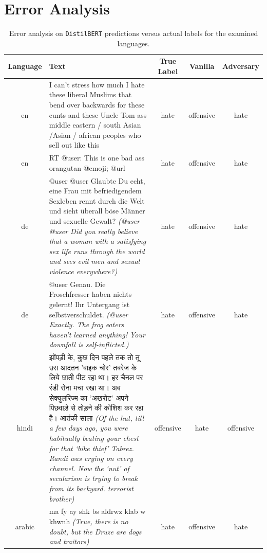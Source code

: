 \documentclass[11pt]{article}
\newcommand{\setfootnotemark}{%
  \refstepcounter{footnote}%
  \footnotemark[\value{footnote}]}
\begin{document}
	\section{Error Analysis}
	
	\begin{table}[h!]
		\small
		\centering
		\begin{tabular}{|c|p{7.4cm}|c|c|c|}
			\hline Language & Text & True Label & Vanilla & Adversary\\ \hline
			en &  I can’t stress how much I hate these liberal Muslims that bend over backwards for these cunts and these Uncle Tom ass middle eastern / south Asian /Asian / african peoples who sell out like this & hate & offensive & hate\\\hline
			en & RT @user: This is one bad ass orangutan @emoji; @url & hate & offensive & hate\\\hline
			de & @user @user Glaubte Du echt, eine Frau mit befriedigendem Sexleben rennt durch die Welt und sieht überall böse Männer und sexuelle Gewalt? \textit{(@user @user Did you really believe that a woman with a satisfying sex life runs through the world and sees evil men and sexual violence everywhere?)}  & hate & offensive & hate\\\hline
			de & @user Genau. Die Froschfresser haben nichts gelernt! Ihr Untergang ist selbstverschuldet. \textit{(@user Exactly. The frog eaters haven't learned anything! Your downfall is self-inflicted.)} & hate & offensive & hate\\\hline
			hindi& {\hindifont झोंपड़ी के, कुछ दिन पहले तक तो तू उस आदतन 'बाइक चोर' तबरेज के लिये छाती पीट रहा था। हर चैनल पर रंडी रोना मचा रखा था। अब सेक्युलरिज्म का 'अखरोट' अपने पिछवाड़े से तोड़ने की कोशिश कर रहा है। आतंकी साला} \textit{(Of the hut, till a few days ago, you were habitually beating your chest for that `bike thief' Tabrez. Randi was crying on every channel. Now the `nut' of secularism is trying to break from its backyard. terrorist brother)} & offensive & hate & offensive\\\hline
			arabic& ma fy ay shk bs aldrwz klab w khwnh\setfootnotemark\label{first} \textit{(True, there is no doubt, but the Druze are dogs and traitors)} & hate & offensive & hate\\\hline
		\end{tabular}
		\caption{Error analysis on \texttt{DistilBERT} predictions versus actual labels for the examined languages.\label{error_analysis}}
	\end{table}
	
\end{document}
